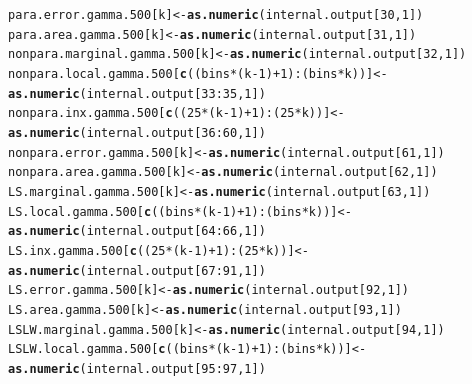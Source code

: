 \documentclass[11pt]{article}\usepackage[]{graphicx}\usepackage[]{color}
\makeatletter
\newcommand{\hlnum}[1]{\textcolor[rgb]{0.686,0.059,0.569}{#1}}%
\newcommand{\hlopt}[1]{\textcolor[rgb]{0,0,0}{#1}}%
\newcommand{\hlstd}[1]{\textcolor[rgb]{0.345,0.345,0.345}{#1}}%
\newcommand{\hlkwb}[1]{\textcolor[rgb]{0.69,0.353,0.396}{#1}}%
\newcommand{\hlkwd}[1]{\textcolor[rgb]{0.737,0.353,0.396}{\textbf{#1}}}%
\newenvironment{kframe}{%
 \def\at@end@of@kframe{}%
 \ifinner\ifhmode%
  \def\at@end@of@kframe{\end{minipage}}%
  \begin{minipage}{\columnwidth}%
 \fi\fi%
 \def\FrameCommand##1{\hskip\@totalleftmargin \hskip-\fboxsep
 \colorbox{shadecolor}{##1}\hskip-\fboxsep
     \hskip-\linewidth \hskip-\@totalleftmargin \hskip\columnwidth}%
 \MakeFramed {\advance\hsize-\width
   \@totalleftmargin\z@ \linewidth\hsize
   \@setminipage}}%
 {\par\unskip\endMakeFramed%
 \at@end@of@kframe}
\newenvironment{knitrout}{}{} %
\makeatother
\begin{document}
\begin{knitrout}
\begin{kframe}
\begin{alltt}
  \hlstd{para.error.gamma.500[k]} \hlkwb{<-} \hlkwd{as.numeric}\hlstd{(internal.output[}\hlnum{30}\hlstd{,} \hlnum{1}\hlstd{])}
  \hlstd{para.area.gamma.500[k]} \hlkwb{<-} \hlkwd{as.numeric}\hlstd{(internal.output[}\hlnum{31}\hlstd{,} \hlnum{1}\hlstd{])}
  \hlstd{nonpara.marginal.gamma.500[k]} \hlkwb{<-} \hlkwd{as.numeric}\hlstd{(internal.output[}\hlnum{32}\hlstd{,} \hlnum{1}\hlstd{])}
  \hlstd{nonpara.local.gamma.500[}\hlkwd{c}\hlstd{((bins}\hlopt{*}\hlstd{(k}\hlopt{-}\hlnum{1}\hlstd{)}\hlopt{+}\hlnum{1}\hlstd{)}\hlopt{:}\hlstd{(bins}\hlopt{*}\hlstd{k))]} \hlkwb{<-}
    \hlkwd{as.numeric}\hlstd{(internal.output[}\hlnum{33}\hlopt{:}\hlnum{35}\hlstd{,} \hlnum{1}\hlstd{])}
  \hlstd{nonpara.inx.gamma.500[}\hlkwd{c}\hlstd{((}\hlnum{25}\hlopt{*}\hlstd{(k}\hlopt{-}\hlnum{1}\hlstd{)}\hlopt{+}\hlnum{1}\hlstd{)}\hlopt{:}\hlstd{(}\hlnum{25}\hlopt{*}\hlstd{k))]} \hlkwb{<-}
    \hlkwd{as.numeric}\hlstd{(internal.output[}\hlnum{36}\hlopt{:}\hlnum{60}\hlstd{,} \hlnum{1}\hlstd{])}
  \hlstd{nonpara.error.gamma.500[k]} \hlkwb{<-} \hlkwd{as.numeric}\hlstd{(internal.output[}\hlnum{61}\hlstd{,} \hlnum{1}\hlstd{])}
  \hlstd{nonpara.area.gamma.500[k]} \hlkwb{<-} \hlkwd{as.numeric}\hlstd{(internal.output[}\hlnum{62}\hlstd{,} \hlnum{1}\hlstd{])}
  \hlstd{LS.marginal.gamma.500[k]} \hlkwb{<-} \hlkwd{as.numeric}\hlstd{(internal.output[}\hlnum{63}\hlstd{,} \hlnum{1}\hlstd{])}
  \hlstd{LS.local.gamma.500[}\hlkwd{c}\hlstd{((bins}\hlopt{*}\hlstd{(k}\hlopt{-}\hlnum{1}\hlstd{)}\hlopt{+}\hlnum{1}\hlstd{)}\hlopt{:}\hlstd{(bins}\hlopt{*}\hlstd{k))]} \hlkwb{<-}
    \hlkwd{as.numeric}\hlstd{(internal.output[}\hlnum{64}\hlopt{:}\hlnum{66}\hlstd{,} \hlnum{1}\hlstd{])}
  \hlstd{LS.inx.gamma.500[}\hlkwd{c}\hlstd{((}\hlnum{25}\hlopt{*}\hlstd{(k}\hlopt{-}\hlnum{1}\hlstd{)}\hlopt{+}\hlnum{1}\hlstd{)}\hlopt{:}\hlstd{(}\hlnum{25}\hlopt{*}\hlstd{k))]} \hlkwb{<-}
    \hlkwd{as.numeric}\hlstd{(internal.output[}\hlnum{67}\hlopt{:}\hlnum{91}\hlstd{,} \hlnum{1}\hlstd{])}
  \hlstd{LS.error.gamma.500[k]} \hlkwb{<-} \hlkwd{as.numeric}\hlstd{(internal.output[}\hlnum{92}\hlstd{,} \hlnum{1}\hlstd{])}
  \hlstd{LS.area.gamma.500[k]} \hlkwb{<-} \hlkwd{as.numeric}\hlstd{(internal.output[}\hlnum{93}\hlstd{,} \hlnum{1}\hlstd{])}
  \hlstd{LSLW.marginal.gamma.500[k]} \hlkwb{<-} \hlkwd{as.numeric}\hlstd{(internal.output[}\hlnum{94}\hlstd{,} \hlnum{1}\hlstd{])}
  \hlstd{LSLW.local.gamma.500[}\hlkwd{c}\hlstd{((bins}\hlopt{*}\hlstd{(k}\hlopt{-}\hlnum{1}\hlstd{)}\hlopt{+}\hlnum{1}\hlstd{)}\hlopt{:}\hlstd{(bins}\hlopt{*}\hlstd{k))]} \hlkwb{<-}
    \hlkwd{as.numeric}\hlstd{(internal.output[}\hlnum{95}\hlopt{:}\hlnum{97}\hlstd{,} \hlnum{1}\hlstd{])}

\end{alltt}
\end{kframe}
\end{knitrout}
\end{document}
